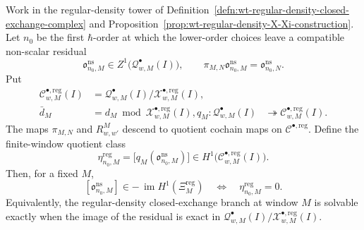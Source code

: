 \begin{prop}
\label{prop:wt-Xi-reg-first-residual-quotient-obstruction}
  Work in the regular-density tower of
  Definition~\ref{defn:wt-regular-density-closed-exchange-complex} and
  Proposition~\ref{prop:wt-regular-density-X-Xi-construction}.  Let
  \(n_0\) be the first \(\hbar\)-order at which the lower-order choices
  leave a compatible non-scalar residual
  \[
    \mathfrak o^{\mathrm{ns}}_{n_0,M}
      \in Z^1\bigl(\mathcal Q^\bullet_{w,M}(I)\bigr),
      \qquad
    \pi_{M,N}\mathfrak o^{\mathrm{ns}}_{n_0,M}
      =
    \mathfrak o^{\mathrm{ns}}_{n_0,N}.
  \]
  Put
  \[
  \begin{aligned}
    \mathcal C^{\bullet,\mathrm{reg}}_{w,M}(I)
      &=
    \mathcal Q^\bullet_{w,M}(I)/
    \mathcal X^{\bullet,\mathrm{reg}}_{w,M}(I),\\
    \bar d_M
      &=
    d_M\bmod
    \mathcal X^{\bullet,\mathrm{reg}}_{w,M}(I),
    q_M\colon
    \mathcal Q^\bullet_{w,M}(I)
      &\twoheadrightarrow
    \mathcal C^{\bullet,\mathrm{reg}}_{w,M}(I).
  \end{aligned}
  \]
  The maps \(\pi_{M,N}\) and \(R^M_{w,w'}\) descend to quotient cochain
  maps on \(\mathcal C^{\bullet,\mathrm{reg}}\).  Define the finite-window
  quotient class
  \[
    \eta^{\mathrm{reg}}_{n_0,M}
      =
    \bigl[q_M(\mathfrak o^{\mathrm{ns}}_{n_0,M})\bigr]
      \in
    H^1\bigl(\mathcal C^{\bullet,\mathrm{reg}}_{w,M}(I)\bigr).
  \]
  Then, for a fixed \(M\),
  \[
    [\mathfrak o^{\mathrm{ns}}_{n_0,M}]
      \in
    -\,\operatorname{im}H^1(\Xi^{\mathrm{reg}}_M)
      \quad\Longleftrightarrow\quad
    \eta^{\mathrm{reg}}_{n_0,M}=0.
  \]
  Equivalently, the regular-density closed-exchange branch at window
  \(M\) is solvable exactly when the image of the residual is exact in
  \(\mathcal Q^\bullet_{w,M}(I)/
  \mathcal X^{\bullet,\mathrm{reg}}_{w,M}(I)\).


\end{prop}
